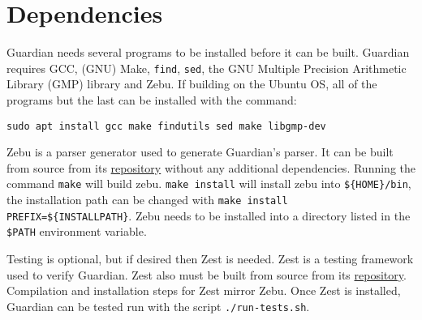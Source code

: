 
\section{Dependencies}
{
	Guardian needs several programs to be installed before it can be built.
	Guardian requires GCC, (GNU) Make, \texttt{find},
	\texttt{sed}, the GNU Multiple
	Precision Arithmetic Library (GMP) library and Zebu. If building
	on the Ubuntu OS, all
	of the programs but the last can be installed with the command:
	
	\begin{lstlisting}
sudo apt install gcc make findutils sed make libgmp-dev
	\end{lstlisting}
	
	Zebu is a parser generator used to generate Guardian's parser. It can be
	built from source from its
	\href{https://github.com/ZanderThannhauser/zebu}{repository} without any
	additional dependencies. Running the command \texttt{make} will build zebu.
	\texttt{make install} will install zebu into \texttt{\$\{HOME\}/bin},
	the installation path can be changed with
	\texttt{make install PREFIX=\$\{INSTALLPATH\}}. Zebu needs to be installed
	into a directory listed in the \texttt{\${PATH}} environment variable.
	
	Testing is optional, but if desired then Zest is needed. Zest is a testing
	framework used to verify Guardian. Zest also must
	be built from source from its
	\href{https://github.com/ZanderThannhauser/zest}{repository}.
	Compilation and installation steps for Zest mirror Zebu. Once Zest is
	installed, Guardian can be tested run with the script \texttt{./run-tests.sh}.
}



























